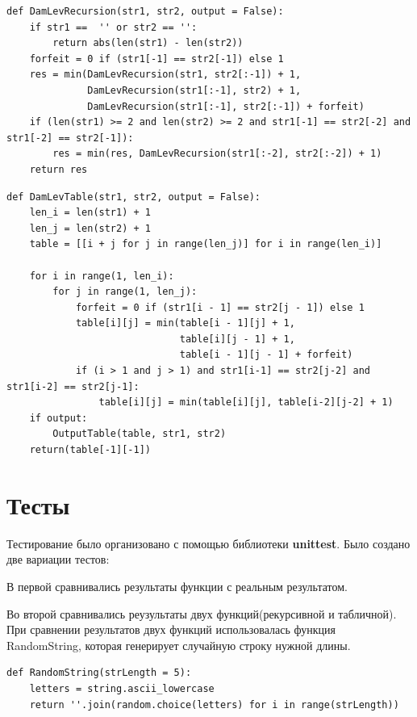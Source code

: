 \documentclass[12pt]{report}
\begin{document}
\begin{lstlisting}[label=some-code,caption=Функция нахождения расстояния Дамерау-Левенштейна рекурсивно]
def DamLevRecursion(str1, str2, output = False):
    if str1 ==  '' or str2 == '':
        return abs(len(str1) - len(str2))
    forfeit = 0 if (str1[-1] == str2[-1]) else 1
    res = min(DamLevRecursion(str1, str2[:-1]) + 1,
              DamLevRecursion(str1[:-1], str2) + 1,
              DamLevRecursion(str1[:-1], str2[:-1]) + forfeit)
    if (len(str1) >= 2 and len(str2) >= 2 and str1[-1] == str2[-2] and str1[-2] == str2[-1]):
        res = min(res, DamLevRecursion(str1[:-2], str2[:-2]) + 1)
    return res 
\end{lstlisting}

\begin{lstlisting}[label=some-code,caption=Функция нахождения расстояния Дамерау-Левенштейна матрично]
def DamLevTable(str1, str2, output = False):
    len_i = len(str1) + 1
    len_j = len(str2) + 1
    table = [[i + j for j in range(len_j)] for i in range(len_i)]
    
    for i in range(1, len_i):
        for j in range(1, len_j):
            forfeit = 0 if (str1[i - 1] == str2[j - 1]) else 1
            table[i][j] = min(table[i - 1][j] + 1,
                              table[i][j - 1] + 1,
                              table[i - 1][j - 1] + forfeit)
            if (i > 1 and j > 1) and str1[i-1] == str2[j-2] and str1[i-2] == str2[j-1]:
                table[i][j] = min(table[i][j], table[i-2][j-2] + 1)
    if output:        
        OutputTable(table, str1, str2)
    return(table[-1][-1])
\end{lstlisting}

\section{Тесты}
Тестирование было организовано с помощью библиотеки  \textbf{unittest}.
Было создано две вариации тестов:

В первой сравнивались результаты функции с реальным результатом.

Во второй сравнивались реузультаты двух функций(рекурсивной и табличной).
При сравнении результатов двух функций использовалась функция RandomString, которая генерирует случайную строку нужной длины.

\begin{lstlisting}[label=randStr,caption=Функция генерации случайной строки]
def RandomString(strLength = 5):
    letters = string.ascii_lowercase
    return ''.join(random.choice(letters) for i in range(strLength))
\end{lstlisting}
\end{document}

